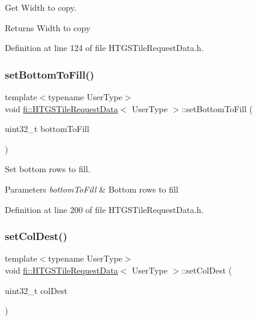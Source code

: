 Get Width to copy. 

\begin{DoxyReturn}{Returns}
Width to copy 
\end{DoxyReturn}


Definition at line 124 of file H\+T\+G\+S\+Tile\+Request\+Data.\+h.

\mbox{\label{classfi_1_1HTGSTileRequestData_a5b862012e40006c84b2a4ec6bc1890a3}} 
\subsubsection{\texorpdfstring{set\+Bottom\+To\+Fill()}{setBottomToFill()}}
{\footnotesize\ttfamily template$<$typename User\+Type$>$ \\
void \hyperlink{classfi_1_1HTGSTileRequestData}{fi\+::\+H\+T\+G\+S\+Tile\+Request\+Data}$<$ User\+Type $>$\+::set\+Bottom\+To\+Fill (\begin{DoxyParamCaption}\item[{uint32\+\_\+t}]{bottom\+To\+Fill }\end{DoxyParamCaption})\hspace{0.3cm}{\ttfamily [inline]}}



Set bottom rows to fill. 


\begin{DoxyParams}{Parameters}
{\em bottom\+To\+Fill} & Bottom rows to fill \\
\hline
\end{DoxyParams}


Definition at line 200 of file H\+T\+G\+S\+Tile\+Request\+Data.\+h.

\mbox{\label{classfi_1_1HTGSTileRequestData_aeb334e3f9a4f4fbef1a497c01bb32d76}} 
\subsubsection{\texorpdfstring{set\+Col\+Dest()}{setColDest()}}
{\footnotesize\ttfamily template$<$typename User\+Type$>$ \\
void \hyperlink{classfi_1_1HTGSTileRequestData}{fi\+::\+H\+T\+G\+S\+Tile\+Request\+Data}$<$ User\+Type $>$\+::set\+Col\+Dest (\begin{DoxyParamCaption}\item[{uint32\+\_\+t}]{col\+Dest }\end{DoxyParamCaption})\hspace{0.3cm}{\ttfamily [inline]}}



